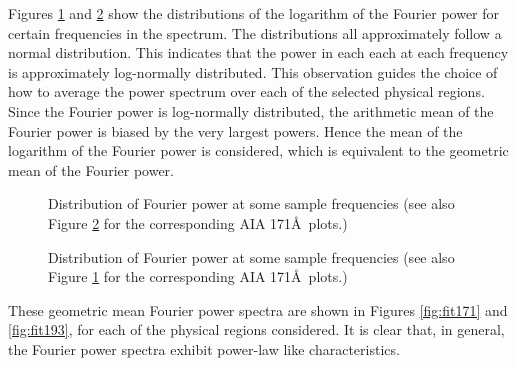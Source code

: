 \documentclass[preprint2]{aastex}
\begin{document}
Figures \ref{fig:dist171} and \ref{fig:dist193} show the distributions
of the logarithm of the Fourier power for certain frequencies in the
spectrum.  The distributions all approximately follow a normal
distribution.  This indicates that the power in each each at each
frequency is approximately log-normally distributed.  This observation
guides the choice of how to average the power spectrum over each of
the selected physical regions.  Since the Fourier power is
log-normally distributed, the arithmetic mean of the Fourier power is
biased by the very largest powers.  Hence the mean of the logarithm of
the Fourier power is considered, which is equivalent to the geometric
mean of the Fourier power.

\begin{figure}
\caption{Distribution of Fourier power at some sample frequencies (see also Figure \ref{fig:dist193} for the corresponding AIA 171\AA\ plots.)}
\label{fig:dist171}
\end{figure}

\begin{figure}
\caption{Distribution of Fourier power at some sample frequencies (see
  also Figure \ref{fig:dist171} for the corresponding AIA
  171\AA\ plots.)}
\label{fig:dist193}
\end{figure}

These geometric mean Fourier power spectra are shown in Figures
\ref{fig:fit171} and \ref{fig:fit193}, for each of the physical
regions considered.  It is clear that, in general, the Fourier power
spectra exhibit power-law like characteristics.
\end{document}
